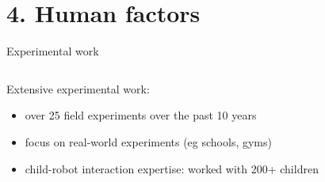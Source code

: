 \documentclass[xcolor=table]{beamer}
\begin{document}

\section{4. Human factors}

{
\begin{frame}{Experimental work}

    \begin{columns}
        \begin{column}{0.4\linewidth}

    Extensive experimental work:

    \begin{itemize}
        \item over 25 field experiments over the past 10 years
        \item focus on real-world experiments (eg schools, gyms) 
        \item child-robot interaction expertise: worked with 200+ children
    \end{itemize}

    \end{column}
        \begin{column}{0.6\linewidth}
    \end{column}
    \end{columns}
\end{frame}
}
\end{document}

